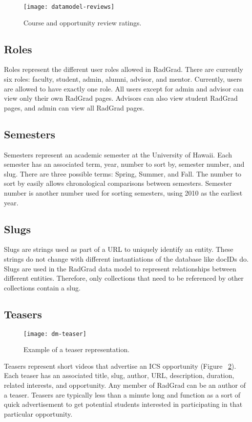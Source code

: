 \begin{figure}[htbp!]
\centering
\texttt{[image: datamodel-reviews]}
\caption{Course and opportunity review ratings.}
\label{ratings}
\end{figure}

\subsection{Roles}
Roles represent the different user roles allowed in RadGrad. There are currently six roles: faculty, student, admin, alumni, advisor, and mentor. Currently, users are allowed to have exactly one role. All users except for admin and advisor can view only their own RadGrad pages. Advisors can also view student RadGrad pages, and admin can view all RadGrad pages. 

\subsection{Semesters}
Semesters represent an academic semester at the University of Hawaii. Each semester has an associated term, year, number to sort by, semester number, and slug. There are three possible terms: Spring, Summer, and Fall. The number to sort by easily allows chronological comparisons between semesters. Semester number is another number used for sorting semesters, using 2010 as the earliest year. 

\subsection{Slugs}
Slugs are strings used as part of a URL to uniquely identify an entity. These strings do not change with different instantiations of the database like docIDs do. Slugs are used in the RadGrad data model to represent relationships between different entities. Therefore, only collections that need to be referenced by other collections contain a slug. 

\subsection{Teasers}
\begin{figure}[htbp!]
\centering
\texttt{[image: dm-teaser]}
\caption{Example of a teaser representation.}
\label{teaser}
\end{figure}
Teasers represent short videos that advertise an ICS opportunity (Figure ~\ref{teaser}). Each teaser has an associated title, slug, author, URL, description, duration, related interests, and opportunity. Any member of RadGrad can be an author of a teaser. Teasers are typically less than a minute long and function as a sort of quick advertisement to get potential students interested in participating in that particular opportunity. 

